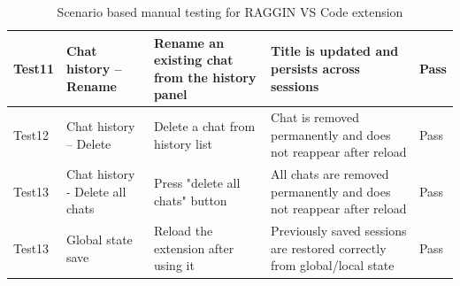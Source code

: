\begin{table}[H]
\begin{tabular}{p{1cm}p{3cm}p{4cm}p{4cm}p{1.5cm}}
		Test11 & Chat history – Rename & Rename an existing chat from the history panel & Title is updated and persists across sessions & Pass \\ \hline
		Test12 & Chat history – Delete & Delete a chat from history list & Chat is removed permanently and does not reappear after reload & Pass \\ \hline
		Test13 & Chat history - Delete all chats & Press "delete all chats" button & All chats are removed permanently and does not reappear after reload & Pass \\ \hline
		Test13 & Global state save & Reload the extension after using it & Previously saved sessions are restored correctly from global/local state & Pass \\ \hline
	\end{tabular}
	\caption{Scenario based manual testing for RAGGIN VS Code extension}
\end{table}